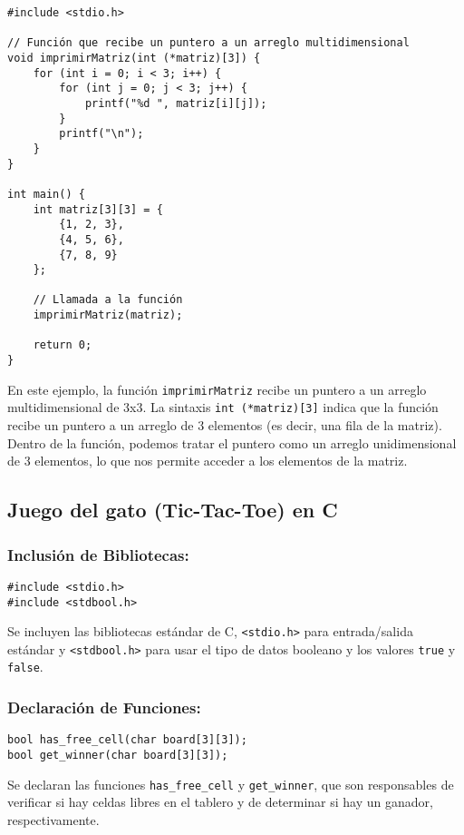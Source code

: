 \begin{verbatim}
#include <stdio.h>

// Función que recibe un puntero a un arreglo multidimensional
void imprimirMatriz(int (*matriz)[3]) {
    for (int i = 0; i < 3; i++) {
        for (int j = 0; j < 3; j++) {
            printf("%d ", matriz[i][j]);
        }
        printf("\n");
    }
}

int main() {
    int matriz[3][3] = {
        {1, 2, 3},
        {4, 5, 6},
        {7, 8, 9}
    };

    // Llamada a la función
    imprimirMatriz(matriz);

    return 0;
}
\end{verbatim}

En este ejemplo, la función \texttt{imprimirMatriz} recibe un puntero a un arreglo multidimensional de 3x3. La sintaxis \texttt{int (*matriz)[3]} indica que la función recibe un puntero a un arreglo de 3 elementos (es decir, una fila de la matriz). Dentro de la función, podemos tratar el puntero como un arreglo unidimensional de 3 elementos, lo que nos permite acceder a los elementos de la matriz.

\subsection{Juego del gato (Tic-Tac-Toe) en C}

\subsubsection{Inclusión de Bibliotecas:}

\begin{verbatim}
#include <stdio.h>
#include <stdbool.h>
\end{verbatim}

Se incluyen las bibliotecas estándar de C, \texttt{<stdio.h>} para entrada/salida estándar y \texttt{<stdbool.h>} para usar el tipo de datos booleano y los valores \texttt{true} y \texttt{false}.

\subsubsection{Declaración de Funciones:}

\begin{verbatim}
bool has_free_cell(char board[3][3]);
bool get_winner(char board[3][3]);
\end{verbatim}

Se declaran las funciones \texttt{has\_free\_cell} y \texttt{get\_winner}, que son responsables de verificar si hay celdas libres en el tablero y de determinar si hay un ganador, respectivamente.

